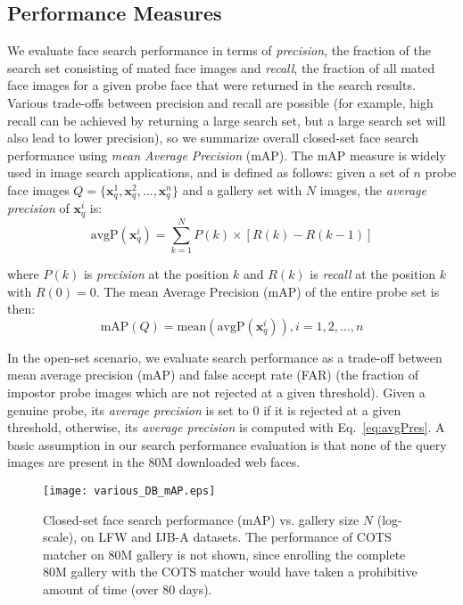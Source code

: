 \documentclass[10pt,journal,compsoc]{IEEEtran}
\def \x {{\mathbf{x}}}
\begin{document}
\subsection{Performance Measures}\label{sec:performance}
We evaluate face search performance in terms of \emph{precision}, the fraction of the search set consisting of mated face images and \emph{recall}, the fraction of all mated face images for a given probe face that were returned in the search results. Various trade-offs between precision and recall are possible (for example, high recall can be achieved by returning a large search set, but a large search set will also lead to lower precision), so we summarize overall closed-set face search performance using \emph{mean Average Precision} (mAP). The mAP measure is widely used in image search applications, and is defined as follows: given a set of $n$ probe face images $Q=\{ \x_{q}^1, \x_{q}^2, \ldots, \x_{q}^n \}$ and a gallery set with $N$ images, the \emph{average precision} of $\x_{q}^i$ is:
\begin{equation}\label{eq:avgPres}
    \mathrm{avgP}(\x_q^i) = \sum_{k=1}^{N} P(k) \times [R(k) - R(k-1)]
\end{equation}

\noindent where $P(k)$ is \emph{precision} at the position $k$ and $R(k)$ is \emph{recall} at the position $k$ with $R(0)=0$. The mean Average Precision (mAP) of the entire probe set is then:
$$\mathrm{mAP}(Q) = \mathrm{mean}(\mathrm{avgP}(\x_q^i)), i=1,2,\ldots, n$$

\noindent In the open-set scenario, we evaluate search performance as a trade-off between mean average precision (mAP) and false accept rate (FAR) (the fraction of impostor probe images which are not rejected at a given threshold). Given a genuine probe, its \emph{average precision} is set to $0$ if it is rejected at a given threshold, otherwise, its \emph{average precision} is computed with Eq.~\ref{eq:avgPres}. A basic assumption in our search performance evaluation is that none of the query images are present in the $80$M downloaded web faces.

\begin{figure}[htbp]
  \centering
  \texttt{[image: various\_DB\_mAP.eps]}
  \caption{Closed-set face search performance (mAP) vs. gallery size $N$ (log-scale), on LFW and IJB-A datasets. The performance of COTS matcher on $80$M gallery is not shown, since enrolling the complete $80$M gallery with the COTS matcher would have taken a prohibitive amount of time (over $80$ days).}
  \label{fig:exp_dbsize}
\end{figure}
\end{document}
